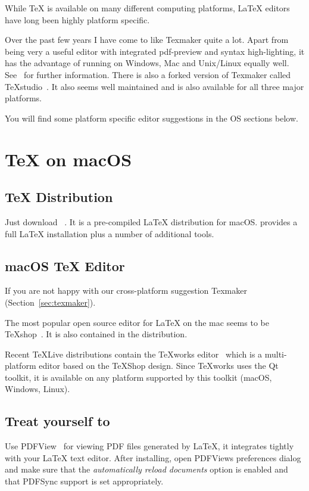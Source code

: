 While \TeX{} is available on many different computing platforms, \LaTeX{}
editors have long been highly platform specific.

Over the past few years I have come to like Texmaker quite a lot.
Apart from being very a useful editor with integrated pdf-preview and syntax
high-lighting, it has the advantage of running on Windows, Mac and
Unix/Linux equally well.  See~\cite{texmaker} for
further information.  There is also a forked version of Texmaker called
TeXstudio~\cite{texstudio}.  It also seems well
maintained and is also available for all three major platforms.

You will find some platform specific editor suggestions in the OS sections
below.

\section{\TeX{} on macOS}

\subsection{\TeX{} Distribution}

Just download ~\cite{mactex}. It is a
pre-compiled \LaTeX{} distribution for macOS\@.  provides a full \LaTeX{}
installation plus a number of additional tools.

\subsection{macOS \TeX{} Editor}

If you are not happy with our cross-platform suggestion Texmaker (Section~\ref{sec:texmaker}).

The most popular open source editor for \LaTeX{} on the mac seems to be
\TeX{}shop~\cite{texshop}. It
is also contained in the  distribution.

Recent \TeX{}Live distributions contain the \TeX{}works editor~\cite{texworks}
which is a multi-platform editor based on the \TeX{}Shop
design. Since \TeX{}works uses the Qt toolkit, it is available on any platform
supported by this toolkit (macOS, Windows, Linux).

\subsection{Treat yourself to }

Use PDFView~\cite{pdfview} for viewing PDF files generated by \LaTeX{}, it integrates tightly
with your \LaTeX{} text editor. After installing, open
PDFViews preferences dialog and make sure that the \emph{automatically reload
  documents} option is enabled and that PDFSync support is set appropriately.

